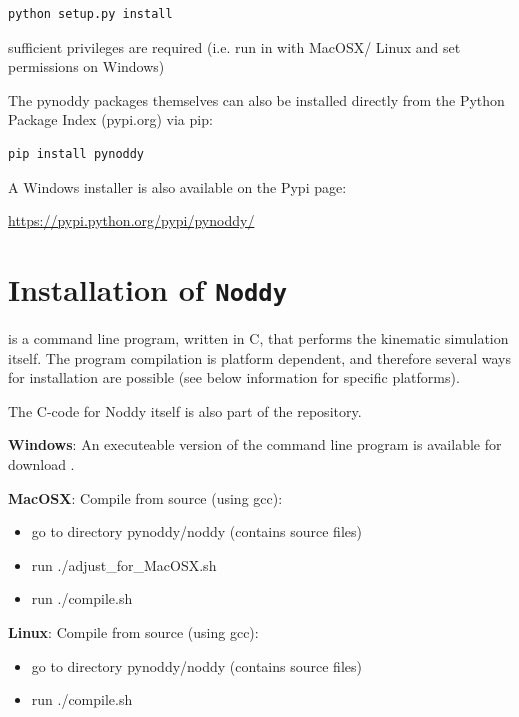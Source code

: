 \documentclass[a4paper,10pt,english]{sphinxmanual}
\begin{document}
\begin{Verbatim}[commandchars=\\\{\}]
python setup.py install
\end{Verbatim}

sufficient privileges are required (i.e. run in  with MacOSX/
Linux and set permissions on Windows)

The pynoddy packages themselves can also be installed directly from the
Python Package Index (pypi.org) via pip:

\begin{Verbatim}[commandchars=\\\{\}]
pip install pynoddy
\end{Verbatim}

A Windows installer is also available on the Pypi page:

\href{https://pypi.python.org/pypi/pynoddy/}{https://pypi.python.org/pypi/pynoddy/}


\section{Installation of \texttt{Noddy}}
\label{readme:installation-of-noddy}
 is a command line program, written in C, that performs the
kinematic simulation itself. The program compilation is platform
dependent, and therefore several ways for installation are possible (see
below information for specific platforms).

The C-code for Noddy itself is also part of the  repository.

\textbf{Windows}: An executeable version of the command line program is available for
download .

\textbf{MacOSX}: Compile from source (using gcc):
\begin{itemize}
\item {} 
go to directory pynoddy/noddy (contains source files)

\item {} 
run ./adjust\_for\_MacOSX.sh

\item {} 
run ./compile.sh

\end{itemize}

\textbf{Linux}: Compile from source (using gcc):
\begin{itemize}
\item {} 
go to directory pynoddy/noddy (contains source files)

\item {} 
run ./compile.sh

\end{itemize}
\end{document}
